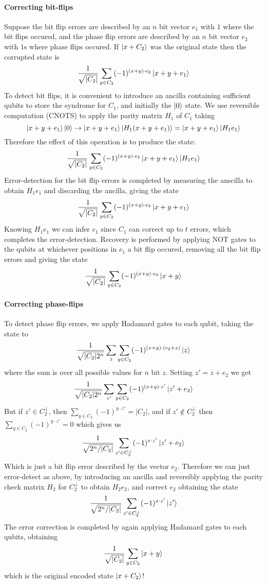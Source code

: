 \documentclass[11pt,a4paper]{article}
\theoremstyle{definition}
\theoremstyle{plain}
\theoremstyle{remark}
\begin{document}
\paragraph{Correcting bit-flips}
Suppose the bit flip errors are described by an $n$ bit vector $e_1$ with $1$
where the bit flips occured, and the phase flip errors are described by an $n$ bit vector $e_2$ with $1$s where phase flips occured. 
If $\ket{x + C_2}$ was the original state then the corrupted state is 
$$\frac{1}{\sqrt{|C_2|}} \sum_{y \in C_2} (-1)^{(x + y) \cdot e_2} \ket{x + y + e_1}$$
To detect bit flips, it is convenient to introduce an ancilla containing sufficient qubits to store the syndrome for $C_1$, and initially the 
$\ket{0}$ state. We use reversible computation (CNOTS) to apply the parity matrix $H_1$ of $C_1$ taking 
$$\ket{x + y + e_1} \ket{0} \to \ket{x + y + e_1} \ket{H_1 (x + y + e_1)} = \ket{x + y + e_1} \ket{H_1 e_1}$$
Therefore the effect of this operation is to produce the state: 
$$\frac{1}{\sqrt{|C_2|}} \sum_{y \in C_2} (-1)^{(x+y) \cdot e_2} \ket{x + y + e_1} \ket{H_1 e_1}$$
Error-detection for the bit flip errors is completed by measuring the anscilla to obtain $H_1 e_1$ and discarding the ancilla, giving the state 
$$\frac{1}{\sqrt{|C_2|}} \sum_{y \in C_2} (-1)^{(x+y) \cdot e_2} \ket{x + y + e_1}$$
Knowing $H_1 e_1$ we can infer $e_1$ since $C_1$ can correct up to $t$ errors, which completes the error-detection. Recovery is performed by 
applying NOT gates to the qubits at whichever positions in $e_1$ a bit flip occured, removing all the bit flip errors and giving the state
$$\frac{1}{\sqrt{|C_2|}} \sum_{y \in C_2} (-1)^{(x+y) \cdot e_2} \ket{x + y}$$

\paragraph{Correcting phase-flips}
To detect phase flip errors, we apply Hadamard gates to each qubit, taking the state to 
$$\frac{1}{\sqrt{|C_2| 2^n}} \sum_z \sum_{y \in C_2} (-1)^{(x+y) \cdot (e_2 + z)} \ket{z}$$
where the sum is over all possible values for $n$ bit $z$. Setting $z' = z + e_2$ we get 
$$\frac{1}{\sqrt{|C_2| 2^n}} \sum_{z'}\sum_{y \in C_2} (-1)^{(x+y) \cdot z'} \ket{z' + e_2}$$
But if $z' \in C_2^\perp$, then $\sum_{y \in C_2} (-1)^{y \cdot z'} = |C_2|$, and if $z' \not\in C_2^\perp$ then 
$\sum_{y \in C_2} (-1)^{y \cdot z'} = 0$ which gives us 
$$\frac{1}{\sqrt{2^n / |C_2|}} \sum_{z' \in C_2^\perp} (-1)^{x \cdot z'} \ket{z' + e_2}$$
Which is just a bit flip error described by the vector $e_2$. Therefore we can just error-detect as above, by introducing 
an ancilla and reversibly applying the parity check matrix $H_2$ for $C_2^\perp$ to obtain $H_2 e_2$, and correct $e_2$ obtaining the state
$$\frac{1}{\sqrt{2^n / |C_2|}} \sum_{z' \in C_2^\perp} (-1)^{x \cdot z'} \ket{z'}$$
The error correction is completed by again applying Hadamard gates to each qubits, obtaining 
$$\frac{1}{\sqrt{|C_2|}} \sum_{y \in C_2} \ket{x + y}$$
which is the original encoded state $\ket{x + C_2}$!
\end{document}
